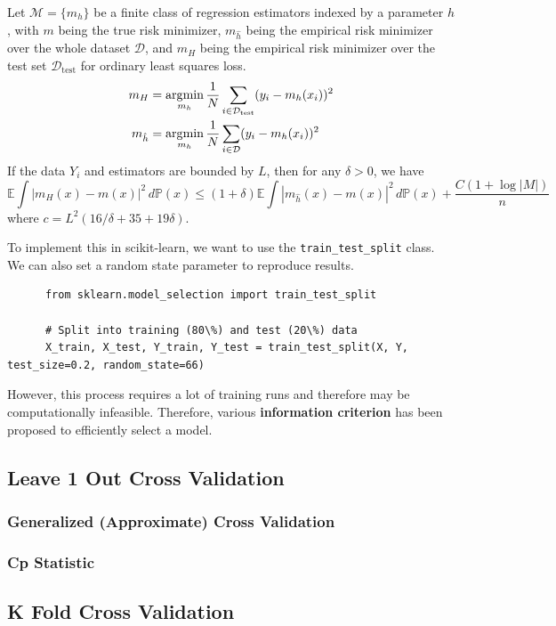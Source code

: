   \begin{theorem}
    Let $\mathcal{M} = \{m_h\}$ be a finite class of regression estimators indexed by a parameter $h$, with $m$ being the true risk minimizer, $m_{\hat{h}}$ being the empirical risk minimizer over the whole dataset $\mathcal{D}$, and $m_{H}$ being the empirical risk minimizer over the test set $\mathcal{D}_{\mathrm{test}}$ for ordinary least squares loss. 
    \begin{align}
      m_H & = \operatorname*{\arg\!\min}_{m_h} \frac{1}{N} \sum_{i \in \mathcal{D}_{\mathrm{test}}} (y_i - m_h(x_i))^2 \\ 
      m_{\hat{h}} & = \operatorname*{\arg\!\min}_{m_h} \frac{1}{N} \sum_{i \in \mathcal{D}} (y_i - m_h(x_i))^2 
    \end{align}
    If the data $Y_i$ and estimators are bounded by $L$, then for any $\delta > 0$, we have 
    \begin{equation}
      \mathbb{E} \int |m_H (x) - m(x)|^2 \,d\mathbb{P}(x) \leq (1 + \delta) \mathbb{E} \int |m_{\hat{h}} (x) - m(x) |^2 \,d \mathbb{P}(x) + \frac{C (1 + \log{|M|})}{n}
    \end{equation}
    where $c = L^2 (16/\delta + 35 + 19\delta)$. 
  \end{theorem}

  \begin{code}
    To implement this in scikit-learn, we want to use the \texttt{train\_test\_split} class. We can also set a random state parameter to reproduce results. 
    \begin{lstlisting}
      from sklearn.model_selection import train_test_split 

      # Split into training (80\%) and test (20\%) data 
      X_train, X_test, Y_train, Y_test = train_test_split(X, Y, test_size=0.2, random_state=66)
    \end{lstlisting}
  \end{code}

  However, this process requires a lot of training runs and therefore may be computationally infeasible. Therefore, various \textbf{information criterion} has been proposed to efficiently select a model. 

\subsection{Leave 1 Out Cross Validation} 

  \subsubsection{Generalized (Approximate) Cross Validation} 

  \subsubsection{Cp Statistic}

\subsection{K Fold Cross Validation}

